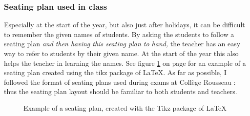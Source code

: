 \documentclass[10pt]{article}
\begin{document}
\subsubsection{Seating plan used in class}
Especially at the start of the year, but also just after holidays, it can be difficult to remember the given names of students. By asking the students to follow a seating plan \emph{and then having this seating plan to hand,} the teacher has an easy way to refer to students by their given name. At the start of the year this also helps the teacher in learning the names. See figure \ref{seatingplan} on page \pageref{seatingplan} for an example of a seating plan created using the tikz package of LaTeX. As far as possible, I followed the format of seating plans used during exams at Collège Rousseau : thus the seating plan layout should be familiar to both students and teachers.

\begin{figure} \label{seatingplan} \centering
\begin{adjustbox}{width=0.8\textwidth, frame=1pt 10pt}
\end{adjustbox}

\caption{Example of a seating plan, created with the Tikz package of \LaTeX}

\end{figure}
\end{document}
